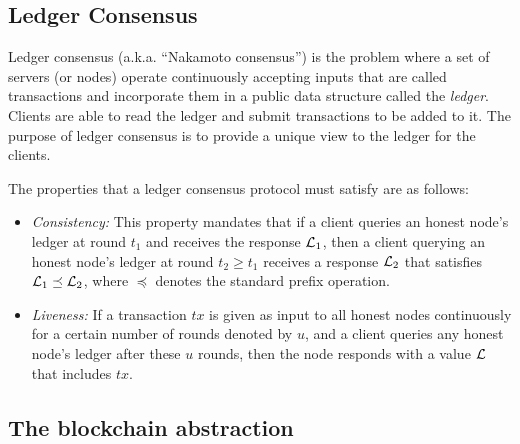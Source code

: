 \subsection{Ledger Consensus}
Ledger consensus (a.k.a. ``Nakamoto consensus'') is the problem where a set of servers
(or nodes) operate continuously accepting inputs
that are called transactions and incorporate them in a public data 
structure called the {\em ledger}. Clients are able to read the ledger
and submit transactions to be
added to it.
The purpose of ledger consensus is to provide a unique
view to the ledger for the clients. 

The properties that a ledger consensus protocol must satisfy are as follows:

\begin{itemize}

\item {\em Consistency:} This property mandates that if a client queries
an honest node's ledger at round $t_1$  
and receives the response $\mathcal{L}_1$, 
then a client querying an honest node's ledger at round $t_2\geq t_1 $
 receives a response $\mathcal{L}_2$ that satisfies $\mathcal{L}_1 \preceq \mathcal{L}_2$, 
where $\preceq$ denotes the standard prefix operation. 

\item {\em Liveness:} If a transaction $tx$ is given as input to all honest
nodes continuously for a certain number of rounds denoted by $u$, 
and a client queries any honest node's ledger
after these $u$ rounds, then the node responds with a value
$\mathcal{L}$ that includes $tx$.

\end{itemize}


\subsection{The blockchain abstraction}


